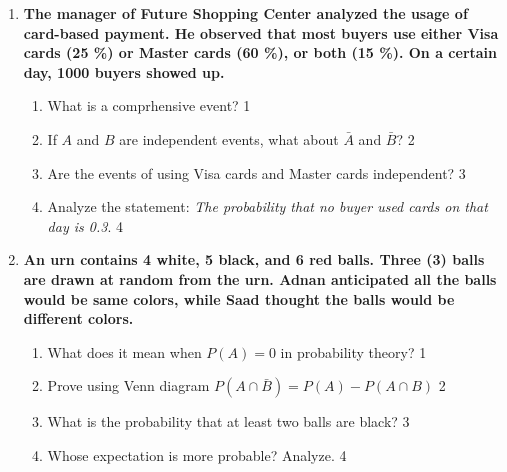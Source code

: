 \documentclass[12pt]{article}
\begin{document}
  \begin{enumerate}
  
   \item
	  \textbf{The manager of Future Shopping Center analyzed the usage of card-based payment. He observed that most buyers use either Visa cards (25 \%) or Master cards (60 \%), or both (15 \%). On a certain day, 1000 buyers showed up.} 
  
  \begin{enumerate}
  
  \item What is a comprhensive event? \hfill 1
 \item If $A$ and $B$ are independent events, what about $\bar A$ and $\bar B$? \hfill 2 
    \item  
	Are the events of using Visa cards and Master cards independent? \hfill 3
    \item
	Analyze the statement: \textit{The probability that no buyer used cards on that day is 0.3}. \hfill 4
  \end{enumerate}


 \item
	  \textbf{An urn contains 4 white, 5 black, and 6 red balls. Three (3) balls are drawn at random from the urn. Adnan anticipated all the balls would be same colors, while Saad thought the balls would be different colors.} 
  
  \begin{enumerate}
    \item What does it mean when \( P(A) = 0 \) in probability theory? \hfill 1
    \item Prove using Venn diagram $P(A\cap \bar B) = P(A) - P(A\cap B)$ \hfill 2
    \item  
	What is the probability that at least two balls are black? \hfill 3
    \item
	Whose expectation is more probable? Analyze.  \hfill 4
  \end{enumerate}

\end{enumerate}

 \vspace{2.5cm}
\end{document}
